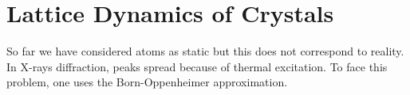 \documentclass[10.75pt,a4paper,openright,bottom=2cm]{article}
\renewcommand{\Vec}[1]{\boldsymbol{#1}}
\begin{document}
\newpage
\section{Lattice Dynamics of Crystals}
So far we have considered atoms as static but this does not correspond to reality. In X-rays diffraction, peaks spread because of thermal excitation. To face this problem, one uses the Born-Oppenheimer approximation.
\end{document}
